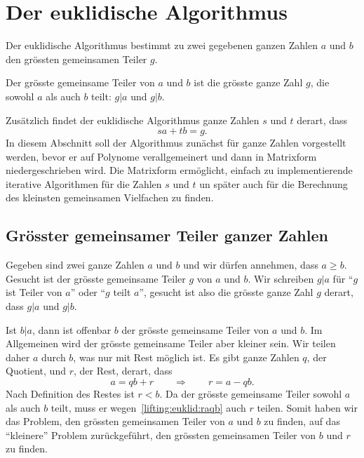 %
%
%
\section{Der euklidische Algorithmus
\label{buch:section:euklid}}
Der euklidische Algorithmus bestimmt zu zwei gegebenen ganzen
Zahlen $a$ und $b$ den grössten gemeinsamen Teiler $g$.

\begin{definition}
\label{buch:endliche-koerper:def:ggt}
Der grösste gemeinsame Teiler von $a$ und $b$ ist die grösste
ganze Zahl $g$, die sowohl $a$ als auch $b$ teilt: $g|a$ und
$g|b$.
%
%
\end{definition}

Zusätzlich findet der euklidische Algorithmus  ganze Zahlen $s$
%
und $t$ derart, dass
\[
sa + tb = g.
\]
In diesem Abschnitt soll der Algorithmus zunächst für ganze Zahlen
vorgestellt werden, bevor er auf Polynome verallgemeinert und dann
in Matrixform niedergeschrieben wird.
Die Matrixform ermöglicht, einfach zu implementierende iterative
Algorithmen für die Zahlen $s$ und $t$ un später auch für die
Berechnung des kleinsten gemeinsamen Vielfachen zu finden.

%
%
\subsection{Grösster gemeinsamer Teiler ganzer Zahlen}
Gegeben sind zwei ganze Zahlen $a$ und $b$ und wir dürfen annehmen,
dass $a\ge b$.
Gesucht ist der grösste gemeinsame Teiler $g$ von $a$ und $b$.
Wir schreiben $g|a$ für ``$g$ ist Teiler von $a$'' oder ``$g$ teilt $a$'',
gesucht ist also die grösste ganze Zahl $g$ derart, dass $g|a$ und $g|b$.

Ist $b|a$, dann ist offenbar $b$ der grösste gemeinsame Teiler von $a$
und $b$.
Im Allgemeinen wird der grösste gemeinsame Teiler aber kleiner sein.
Wir teilen daher $a$ durch $b$, was nur mit Rest möglich ist.
Es gibt ganze Zahlen $q$, der Quotient, und $r$, der Rest, derart, dass
\begin{equation}
a = qb+ r
\qquad \Rightarrow \qquad
r = a - qb.
\label{lifting:euklid:raqb}
\end{equation}
Nach Definition des Restes ist $r < b$.
Da der grösste gemeinsame Teiler sowohl $a$ als auch $b$ teilt, muss er
wegen~\eqref{lifting:euklid:raqb} auch $r$ teilen.
Somit haben wir das Problem, den grössten gemeinsamen Teiler von $a$ und
$b$ zu finden, auf das ``kleinere'' Problem zurückgeführt, den grössten
gemeinsamen Teiler von $b$ und $r$ zu finden.

